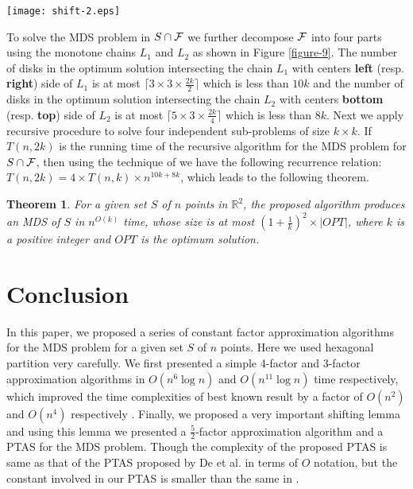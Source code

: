 \documentclass[a4paper,11pt]{article}
\newcommand{\IR}{\mathbb{R}}
\newtheorem{theorem}{Theorem}
\begin{document}
\begin{figure*}[!ht]
\begin{center}
\texttt{[image: shift-2.eps]}
\end{center} 
\caption{Demonstration of PTAS}
\label{figure-9}
\end{figure*}

To solve the MDS problem in $S \cap {\cal F}$ we further decompose ${\cal F}$ into four parts using 
the monotone chains $L_1$ and $L_2$ as shown in Figure \ref{figure-9}. The number of disks in the 
optimum solution intersecting the chain $L_1$ with centers {\bf left} (resp. {\bf right}) side of 
$L_1$ is at most $\lceil 3 \times 3 \times \frac{2k}{2} \rceil$ which is less than $10k$ and the 
number of disks in the optimum solution intersecting the chain $L_2$ with centers {\bf bottom} 
(resp. {\bf top}) side of $L_2$ is at most $\lceil 5 \times 3 \times \frac{2k}{4} \rceil$ which 
is less than $8k$. Next we apply recursive procedure to solve four independent sub-problems of 
size $k \times k$. If $T(n,2k)$ is the running time of the recursive algorithm for the MDS problem 
for $S \cap {\cal F}$, then using the technique of \cite{DDCN13} we have the following recurrence 
relation: $T(n, 2k) = 4 \times T(n, k) \times n ^{10k + 8k}$, which leads to the following theorem. 

\begin{theorem}\label{theorem-4y}
 For a given set $S$ of $n$ points in $\IR^2$, the proposed algorithm produces an MDS of  
 $S$ in $n^{O(k)}$ time, whose size is at most $(1+\frac{1}{k})^2 \times |OPT|$, where $k$ is a 
 positive integer and $OPT$ is the optimum solution. 
\end{theorem}


\section{Conclusion}
In this paper, we proposed a series of constant factor approximation algorithms for the MDS 
problem for a given set $S$ of $n$ points. Here we used hexagonal partition very carefully.
We first presented a simple 4-factor and 3-factor approximation algorithms in $O(n^6 \log n)$ 
and $O(n^{11} \log n)$ time respectively, which improved the time complexities of best known 
result by a factor of $O(n^2)$ and $O(n^4)$ respectively \cite{DDCN13}. Finally, we proposed a 
very important shifting lemma and using this lemma we presented a $\frac{5}{2}$-factor approximation 
algorithm and a PTAS for the MDS problem. Though the complexity of the proposed PTAS is same as that 
of the PTAS proposed by De et al. \cite{DDCN13} in terms of $O$ notation, but the constant involved 
in our PTAS is smaller than the same in \cite{DDCN13}.
\end{document}
